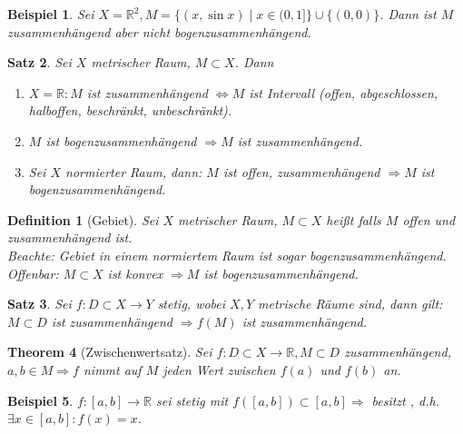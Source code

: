 \documentclass[ngerman,a4paper]{report}
\theoremstyle{break}
\newtheorem{theorem}{Theorem}[section]
\newtheorem{example}[theorem]{Beispiel}
\newtheorem{satz}[theorem]{Satz}
\newtheorem*{definition}{Definition}
\begin{document}
\begin{example}
    Sei $X=\mathbb{R}^2, M = \{(x,\sin x) \mid x \in (0,1]\} \cup \{(0,0)\}$. Dann ist $M$ zusammenhängend aber nicht bogenzusammenhängend.
\end{example}

\addtocounter{theorem}{1}
\begin{satz}
    Sei $X$ metrischer Raum, $M \subset X$. Dann
    \begin{enumerate}[label={\arabic*)}]
    \item $X = \mathbb{R}: M$ ist zusammenhängend $\Leftrightarrow M$ ist Intervall (offen, abgeschlossen, halboffen, beschränkt, unbeschränkt).
    \item $M$ ist bogenzusammenhängend $\Rightarrow M$ ist zusammenhängend.
    \item Sei $X$ normierter Raum, dann: $M$ ist offen, zusammenhängend $\Rightarrow M$ ist bogenzusammenhängend.
    \end{enumerate}
\end{satz}

\begin{definition}[Gebiet]
    Sei $X$ metrischer Raum, $M \subset X$ heißt  falls $M$ offen und zusammenhängend ist.\\
    Beachte: Gebiet in einem normiertem Raum ist sogar bogenzusammenhängend.\\
    Offenbar: $M \subset X$ ist konvex $\Rightarrow M$ ist bogenzusammenhängend.
\end{definition}

\begin{satz}
    Sei $f: D\subset X\to Y$ stetig, wobei $X,Y$ metrische Räume sind, dann gilt: $M \subset D$ ist zusammenhängend $\Rightarrow f(M)$ ist zusammenhängend.
\end{satz}

\begin{theorem}[Zwischenwertsatz]
    Sei $f: D \subset X \to \mathbb{R}, M \subset D$ zusammenhängend, $a,b \in M \Rightarrow f$ nimmt auf $M$ jeden Wert zwischen $f(a)$ und $f(b)$ an.
\end{theorem}

\addtocounter{theorem}{1}

\begin{example}
    $f:[a,b] \to \mathbb{R}$ sei stetig mit $f([a,b]) \subset [a,b] \Rightarrow$ besitzt , d.h. $\exists x \in [a,b]\colon f(x)=x$.
\end{example}
\end{document}
